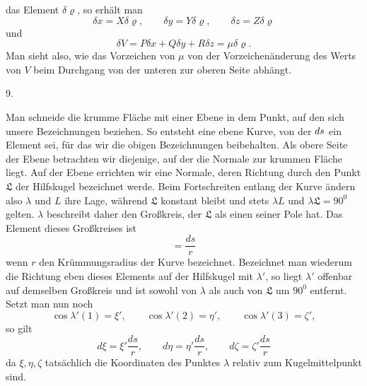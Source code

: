 %
das Element $\delta\varrho$, so erhält man
\[
\delta x=X\delta\varrho,\qquad\delta y=Y\delta\varrho,\qquad\delta z=Z\delta\varrho
\]
und
\[
\delta V=P\delta x+Q\delta y+R\delta z=\mu\delta\varrho.
\]
Man sieht also, wie das Vorzeichen von $\mu$ von der Vorzeichenänderung des Werts von $V$ beim Durchgang von der unteren zur oberen Seite abhängt.

\begin{center}9.\end{center}
\noindent\hspace*{1.2em}Man schneide die krumme Fläche mit einer Ebene in dem Punkt, auf den sich unsere Bezeichnungen beziehen. So entsteht eine ebene Kurve, von der $ds\mathord{\hbox{}}$ ein Element sei, für das wir die obigen Bezeichnungen beibehalten. Als obere Seite der Ebene betrachten wir diejenige, auf der die Normale zur krummen Fläche liegt. Auf der Ebene errichten wir eine Normale, deren Richtung durch den Punkt $\mathfrak{L}$ der Hilfskugel bezeichnet werde. Beim Fortschreiten entlang der Kurve ändern also $\lambda$ und $L$ ihre Lage, während $\mathfrak{L}$ konstant bleibt und stets $\lambda L$ und $\lambda\mathfrak{L}=90^{0}$ gelten. $\lambda$ beschreibt daher den Großkreis, der $\mathfrak{L}$ als einen seiner Pole hat. Das Element dieses Großkreises ist
\[
=\frac{ds}{r}
\]
wenn $r$ den Krümmungsradius der Kurve bezeichnet. Bezeichnet man wiederum die Richtung eben dieses Elements auf der Hilfskugel mit $\lambda'$, so liegt $\lambda'$ offenbar auf demselben Großkreis und ist sowohl von $\lambda$ als auch von $\mathfrak{L}$ um $90^{0}$ entfernt. Setzt man nun noch
\[
\cos\lambda'(1)=\xi',\qquad\cos\lambda'(2)=\eta',\qquad\cos\lambda'(3)=\zeta',
\]
so gilt
\[
d\xi=\xi'\frac{ds}{r},\qquad d\eta=\eta'\frac{ds}{r},\qquad d\zeta=\zeta'\frac{ds}{r}
\]
da $\xi,\eta,\zeta$ tatsächlich die Koordinaten des Punktes $\lambda$ relativ zum Kugelmittelpunkt sind.
